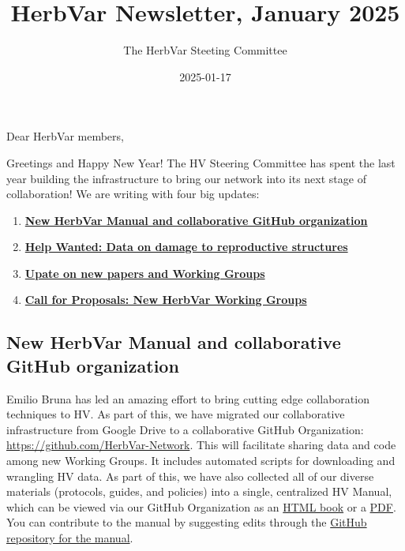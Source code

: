 \documentclass[
  12pt,
]{article}
\title{HerbVar Newsletter, January 2025}
\author{The HerbVar Steeting Committee}
\date{2025-01-17}
\providecommand{\tightlist}{%
  \setlength{\itemsep}{0pt}\setlength{\parskip}{0pt}}
\begin{document}
\maketitle

\thispagestyle{empty}

Dear HerbVar members,

Greetings and Happy New Year! The HV Steering Committee has spent the
last year building the infrastructure to bring our network into its next
stage of collaboration! We are writing with four big updates:

\begin{enumerate}
\def\labelenumi{\arabic{enumi}.}
\tightlist
\item
  \textbf{\hyperref[manual]{New HerbVar Manual and collaborative GitHub
  organization}}\\
\item
  \textbf{\hyperref[help]{Help Wanted: Data on damage to reproductive
  structures}}\\
\item
  \textbf{\hyperref[wg1]{Upate on new papers and Working Groups}}\\
\item
  \textbf{\hyperref[wg2]{Call for Proposals: New HerbVar Working
  Groups}}
\end{enumerate}

\subsection{New HerbVar Manual and collaborative GitHub
organization}\label{manual}

Emilio Bruna has led an amazing effort to bring cutting edge
collaboration techniques to HV. As part of this, we have migrated our
collaborative infrastructure from Google Drive to a collaborative GitHub
Organization: \url{https://github.com/HerbVar-Network}. This will
facilitate sharing data and code among new Working Groups. It includes
automated scripts for downloading and wrangling HV data. As part of
this, we have also collected all of our diverse materials (protocols,
guides, and policies) into a single, centralized HV Manual, which can be
viewed via our GitHub Organization as an
\href{https://herbvar-network.github.io/herbvar_manual/}{HTML book} or a
\href{https://herbvar-network.github.io/herbvar_manual/herbvar-manual.pdf}{PDF}.
You can contribute to the manual by suggesting edits through the
\href{https://github.com/HerbVar-Network/herbvar_manual}{GitHub
repository for the manual}.
\end{document}

